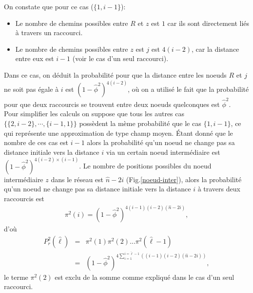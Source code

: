 \begin{itemize}
\begin{figure}[h]
\end{figure}
On constate que pour ce cas ($\{1,i-1\}$):
\begin{itemize}
	\item Le nombre de chemins possibles entre $R$ et $z$ est $1$ car ils sont directement liés à travers un raccourci.
	\item Le nombre de chemins possibles entre $z$ est $j$ est $4(i-2)$, car la distance entre eux est $i-1$ (voir le cas d'un seul raccourci).  
\end{itemize}
Dans ce cas, on déduit la probabilité pour que la distance entre les noeuds $R$ et $j$ ne soit pas égale à $i$ est $(1-\hat{\phi}^2)^{4(i-2)}$, où on a utilisé le fait que la probabilité pour que deux raccourcis se trouvent entre deux noeuds quelconques est $\hat{\phi}^2$.\\
Pour simplifier les calculs on suppose que tous les autres cas $\{\{2,i-2\},\cdots,\{i-1,1\}\}$ possèdent la mème probabilité que le cas $\{1,i-1\}$, ce qui représente une approximation de type champ moyen. Étant donné que le nombre de ces cas est $i-1$ alors la probabilité qu'un noeud ne change pas sa distance initiale vers la distance  $i$ via un certain noeud intermédiaire est $(1-\hat{\phi}^2)^{4(i-2)\times(i-1)}$.
Le nombre de positions possibles du noeud intermédiaire $z$ dans le réseau est $\hat{n}-2i$ (Fig.\ref{noeud-inter}), alors la probabilité qu'un noeud ne change pas sa distance initiale vers la distance  $i$ à travers deux raccourcis est 
\begin{eqnarray}
	\pi^2(i)=(1-\hat{\phi}^2)^{4(i-1)(i-2)(\hat{n}-2i)},
\end{eqnarray}
d'où
\begin{eqnarray}
	P_r^2(\hat{\ell})&=&\pi^2(1)\pi^2(2)...\pi^2(\hat{\ell}-1)\\\nonumber
	&=& (1-\hat{\phi}^2)^{4\sum_{i=1}^{i=\hat{\ell}-1}((i-1)(i-2)(\hat{n}-2i))},
\end{eqnarray}
le terme $\pi^2(2)$ est exclu de la somme comme expliqué dans le cas d'un seul raccourci.\\
	

\end{itemize}

